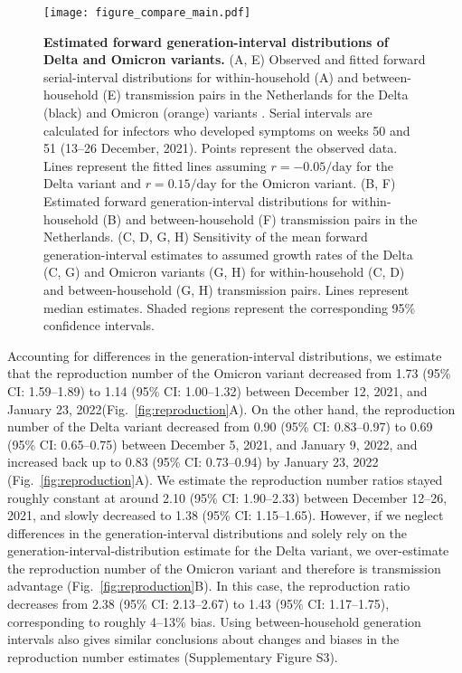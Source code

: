 \documentclass[12pt]{article}
\newcommand{\fref}[1]{Fig.~\ref{fig:#1}}
\begin{document}
\begin{figure}[!th]
\texttt{[image: figure\_compare\_main.pdf]}
\caption{
\textbf{Estimated forward generation-interval distributions of Delta and Omicron variants.}
(A, E) Observed and fitted forward serial-interval distributions for within-household (A) and between-household (E) transmission pairs in the Netherlands for the Delta (black) and Omicron (orange) variants \citep{backer2021omicron}.
Serial intervals are calculated for infectors who developed symptoms on weeks 50 and 51 (13--26 December, 2021).
Points represent the observed data.
Lines represent the fitted lines assuming $r=-0.05/\textrm{day}$ for the Delta variant and $r=0.15/\textrm{day}$ for the Omicron variant.
(B, F) Estimated forward generation-interval distributions for within-household (B) and between-household (F) transmission pairs in the Netherlands.
(C, D, G, H) Sensitivity of the mean forward generation-interval estimates to assumed growth rates of the Delta (C, G) and Omicron variants (G, H) for within-household (C, D) and between-household (G, H) transmission pairs.
Lines represent median estimates.
Shaded regions represent the corresponding 95\% confidence intervals.
\label{fig:serial}
}
\end{figure}

Accounting for differences in the generation-interval distributions, we estimate that the reproduction number of the Omicron variant decreased from 1.73 (95\% CI: 1.59--1.89) to 1.14 (95\% CI: 1.00--1.32) between December 12, 2021, and January 23, 2022(\fref{reproduction}A).
On the other hand, the reproduction number of the Delta variant decreased from 0.90 (95\% CI: 0.83--0.97) to 0.69 (95\% CI: 0.65--0.75) between December 5, 2021, and January 9, 2022, and increased back up to 0.83 (95\% CI: 0.73--0.94) by January 23, 2022 (\fref{reproduction}A).
We estimate the reproduction number ratios stayed roughly constant at around 2.10 (95\% CI: 1.90--2.33) between December 12--26, 2021, and slowly decreased to 1.38 (95\% CI: 1.15--1.65).
However, if we neglect differences in the generation-interval distributions and solely rely on the generation-interval-distribution estimate for the Delta variant, we over-estimate the reproduction number of the Omicron variant and therefore is transmission advantage (\fref{reproduction}B).
In this case, the reproduction ratio decreases from 2.38 (95\% CI: 2.13--2.67) to 1.43 (95\% CI: 1.17--1.75), corresponding to roughly 4--13\% bias.
Using between-household generation intervals also gives similar conclusions about changes and biases in the reproduction number estimates (Supplementary Figure S3).
\end{document}
